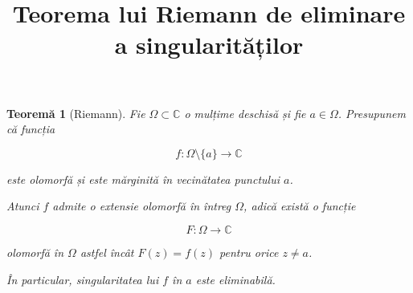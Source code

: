 \documentclass[12pt]{article}
\title{\Large\textbf{Teorema lui Riemann de eliminare a singularităților}}
\date{}
\theoremstyle{plain}
\newtheorem{theorem}{Teoremă}
\begin{document}
\maketitle

\begin{theorem}[Riemann]
Fie $\Omega \subset \mathbb{C}$ o mulțime deschisă și fie $a \in \Omega$.  
Presupunem că funcția


\[
f : \Omega \setminus \{a\} \to \mathbb{C}
\]


este olomorfă și este mărginită în vecinătatea punctului $a$.

Atunci $f$ admite o extensie olomorfă în întreg $\Omega$, adică există o funcție


\[
F : \Omega \to \mathbb{C}
\]


olomorfă în $\Omega$ astfel încât $F(z) = f(z)$ pentru orice $z \ne a$.

În particular, singularitatea lui $f$ în $a$ este eliminabilă.
\end{theorem}
\end{document}
